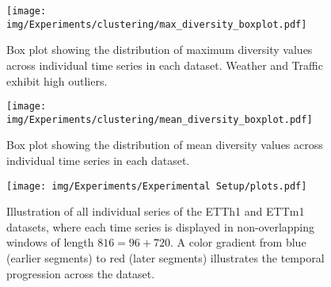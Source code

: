 \documentclass[a4paper,oneside,bibliography=totoc]{scrbook}
\begin{document}
\begin{figure}[h]
     \centering
        \texttt{[image: img/Experiments/clustering/max\_diversity\_boxplot.pdf]}
        \caption{Box plot showing the distribution of maximum diversity values across individual time series in each dataset. Weather and Traffic exhibit high outliers.}
        \label{fig:clustering-max_diversity}
\end{figure}

\begin{figure}
     \centering
        \texttt{[image: img/Experiments/clustering/mean\_diversity\_boxplot.pdf]}
        \caption{Box plot showing the distribution of mean diversity values across individual time series in each dataset.}
        \label{fig:clustering-mean_diversity}
\end{figure}


\begin{figure}[h]
    \centering
    \texttt{[image: img/Experiments/Experimental Setup/plots.pdf]}
    \caption{Illustration of all individual series of the ETTh1 and ETTm1 datasets, where each time series is displayed in non-overlapping windows of length $816=96+720$. A color gradient from blue (earlier segments) to red (later segments) illustrates the temporal progression across the dataset.}
    \label{fig:full_data}
\end{figure}
\end{document}
